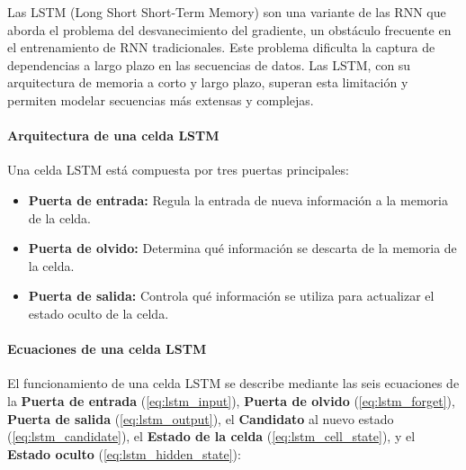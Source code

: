 Las LSTM (Long Short Short-Term Memory) son una variante de las RNN que aborda el problema del desvanecimiento del gradiente, un obstáculo frecuente en el entrenamiento de RNN tradicionales. Este problema dificulta la captura de dependencias a largo plazo en las secuencias de datos. Las LSTM, con su arquitectura de memoria a corto y largo plazo, superan esta limitación y permiten modelar secuencias más extensas y complejas.

\paragraph{Arquitectura de una celda LSTM}

Una celda LSTM está compuesta por tres puertas principales:

\begin{itemize}
    \item \textbf{Puerta de entrada:} Regula la entrada de nueva información a la memoria de la celda.
    \item \textbf{Puerta de olvido:} Determina qué información se descarta de la memoria de la celda.
    \item \textbf{Puerta de salida:}  Controla qué información se utiliza para actualizar el estado oculto de la celda.
\end{itemize}

\paragraph{Ecuaciones de una celda LSTM}

El funcionamiento de una celda LSTM se describe mediante las seis ecuaciones de la \textbf{Puerta de entrada} (\ref{eq:lstm_input}), \textbf{Puerta de olvido} (\ref{eq:lstm_forget}), \textbf{Puerta de salida} (\ref{eq:lstm_output}), el \textbf{Candidato} al nuevo estado (\ref{eq:lstm_candidate}), el \textbf{Estado de la celda} (\ref{eq:lstm_cell_state}), y el \textbf{Estado oculto} (\ref{eq:lstm_hidden_state}):



